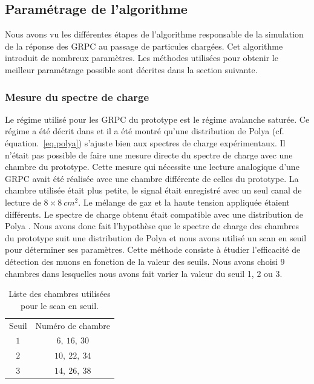 
\subsection{Paramétrage de l'algorithme}
\label{sec.param}
Nous avons vu les différentes étapes de l'algorithme responsable de la simulation de la réponse des GRPC au passage de particules chargées. Cet algorithme introduit de nombreux paramètres. Les méthodes utilisées pour obtenir le meilleur paramétrage possible sont décrites dans la section suivante. 

\subsubsection{Mesure du spectre de charge}
% 
\label{sec.polya}
Le régime utilisé pour les GRPC du prototype est le régime avalanche saturée. Ce régime a été décrit dans \cite{abbresciaPolya} et il a été montré qu'une distribution de Polya (cf. équation.~\ref{eq.polya}) s'ajuste bien aux spectres de charge expérimentaux. Il n'était pas possible de faire une mesure directe du spectre de charge avec une chambre du prototype. Cette mesure qui nécessite une lecture analogique d'une GRPC avait été réalisée avec une chambre différente de celles du prototype. La chambre utilisée était plus petite, le signal était enregistré avec un seul canal de lecture de $8 \times 8 ~cm^{2}$. Le mélange de gaz et la haute tension appliquée étaient différents. Le spectre de charge obtenu était compatible avec une distribution de Polya \cite{kieffer}. Nous avons donc fait l'hypothèse que le spectre de charge  des chambres du prototype suit une distribution de Polya et nous avons utilisé un scan en seuil pour déterminer ses paramètres. Cette méthode consiste à étudier l'efficacité de détection des muons en fonction de la valeur des seuils. Nous avons choisi 9 chambres dans lesquelles nous avons fait varier la valeur du seuil 1, 2 ou 3.
\begin{table}[!ht]
  \begin{center}
    \begin{tabular}{c|c}
      \rowcolor{black!20!white}Seuil & Numéro de chambre\\
      \rowcolor{black!5!white}\hline
      \rowcolor{black!5!white}$1$ & $6,~16,~30$\\
      \rowcolor{black!5!white}$2$ & $10,~22,~34$\\
      \rowcolor{black!5!white}$3$ & $14,~26,~38$\\
    \end{tabular}
  \end{center}
  \caption{Liste des chambres utilisées pour le scan en seuil.}
  \label{tab.thrScan}
\end{table}
